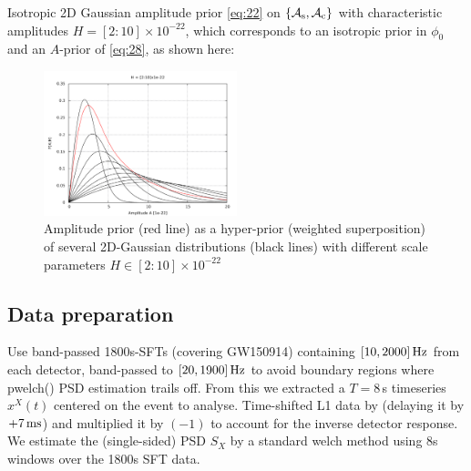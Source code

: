 \documentclass[aps,prd,onecolumn,notitlepage,nofootinbib,superscriptaddress,altaffilletter,floatfix]{revtex4-1}
\begin{document}
Isotropic 2D Gaussian amplitude prior \eqref{eq:22} on $\{{\mathcal A}_{\mathrm{s}},{\mathcal A}_{\mathrm{c}}\}$ with characteristic amplitudes $H = [2 : 10]\times10^{-22}$, which corresponds to
an isotropic prior in $\phi_0$ and an $A$-prior of \eqref{eq:28}, as shown here:
\begin{figure}[htbp]
  \centering
  \includegraphics[width=0.5\textwidth]{prior_A.pdf}
  \caption{Amplitude prior (red line) as a hyper-prior (weighted superposition) of several 2D-Gaussian distributions (black lines) with different
    scale parameters $H\in{[2:10]}\times10^{-22}$}
  \label{fig:AmpPrior}
\end{figure}

\subsection{Data preparation}
\label{sec:data-preparation}

Use band-passed 1800s-SFTs (covering GW150914) containing $[10,2000]\,\mathrm{Hz}$ from each detector, band-passed to $[20,1900]\,\mathrm{Hz}$ to avoid boundary
regions where pwelch() PSD estimation trails off.
From this we extracted a $T=8\,$s timeseries $x^X(t)$ centered on the event to analyse.
Time-shifted L1 data by (delaying it by $+7\,\mathrm{ms}$) and multiplied it by $(-1)$ to account for the inverse detector response.
We estimate the (single-sided) PSD $S_X$ by a standard welch method using 8s windows over the 1800s SFT data.
\end{document}
